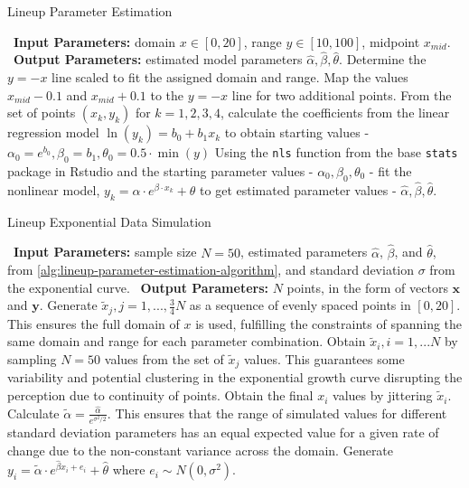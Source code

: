 \documentclass[12pt]{article}
\begin{document}
\begin{algorithm}
  \caption{Lineup Parameter Estimation}\label{alg:lineup-parameter-estimation-algorithm}
  \begin{algorithmic}[1]
    \Statex \textbullet~\textbf{Input Parameters:} domain $x\in[0,20]$, range $y\in[10,100]$, midpoint $x_{mid}$.
    \Statex \textbullet~\textbf{Output Parameters:} estimated model parameters $\hat\alpha, \hat\beta, \hat\theta$.
    \State Determine the $y=-x$ line scaled to fit the assigned domain and range.
    \State Map the values $x_{mid} - 0.1$ and $x_{mid} + 0.1$ to the $y=-x$ line for two additional points.
    \State From the set of points $(x_k, y_k)$ for $k = 1,2,3,4$, calculate the coefficients from the linear regression model $\ln(y_k) = b_0 +b_1x_k$ to obtain starting values - $\alpha_0 = e^{b_0}, \beta_0 =  b_1, \theta_0 = 0.5\cdot \min(y)$
    \State Using the \texttt{nls} function from the base \texttt{stats} package in Rstudio and the starting parameter values - $\alpha_0, \beta_0, \theta_0$ - fit the nonlinear model, $y_k = \alpha\cdot e^{\beta\cdot x_k}+\theta$ to get estimated parameter values - $\hat\alpha, \hat\beta, \hat\theta.$
  \end{algorithmic}
\end{algorithm}

\begin{algorithm}
  \caption{Lineup Exponential Data Simulation}\label{alg:lineup-exponential-data-simulation-algorithm}
  \begin{algorithmic}[1]
    \Statex \textbullet~\textbf{Input Parameters:} sample size $N = 50$, estimated parameters $\hat\alpha$, $\hat\beta$, and $\hat\theta$, from \cref{alg:lineup-parameter-estimation-algorithm}, and standard deviation $\sigma$ from the exponential curve.
    \Statex \textbullet~\textbf{Output Parameters:} $N$ points, in the form of vectors $\mathbf{x}$ and $\mathbf{y}$.
    \State Generate $\tilde x_j, j = 1,..., \frac{3}{4}N$ as a sequence of evenly spaced points in $[0,20]$. This ensures the full domain of $x$ is used, fulfilling the constraints of spanning the same domain and range for each parameter combination.
    \State Obtain $\tilde x_i, i = 1,...N$ by sampling $N = 50$ values from the set of $\tilde x_j$ values. This guarantees some variability and potential clustering in the exponential growth curve disrupting the perception due to continuity of points.
    \State Obtain the final $x_i$ values by jittering $\tilde x_i$.
    \State Calculate $\tilde\alpha = \frac{\hat\alpha}{e^{\sigma^2/2}}.$ This ensures that the range of simulated values for different standard deviation parameters has an equal expected value for a given rate of change due to the non-constant variance across the domain.
    \State Generate $y_i = \tilde\alpha\cdot e^{\hat\beta x_i + e_i}+\hat\theta$ where $e_i\sim N(0,\sigma^2).$
  \end{algorithmic}
\end{algorithm}
\end{document}
